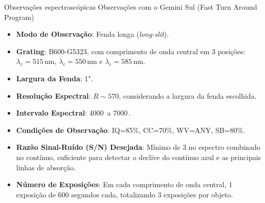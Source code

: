 \begin{frame}[c]{Observações espectroscópicas}
Observações com o Gemini Sul (Fast Turn Around Program)
\footnotesize
\begin{itemize}
    \item \textbf{Modo de Observação}: Fenda longa (\textit{long-slit}).
    \item \textbf{Grating}: B600-G5323, com comprimento de onda central em 3 posições: $\lambda_c = 515 \, \text{nm}$, $\lambda_c = 550 \, \text{nm}$ e $\lambda_c = 585 \, \text{nm}$.
    \item \textbf{Largura da Fenda}: 1".
    \item \textbf{Resolução Espectral}: $R \sim 570$, considerando a largura da fenda escolhida.
    \item \textbf{Intervalo Espectral}: 4000\, a 7000\,.
    \item \textbf{Condições de Observação}: IQ=85\%, CC=70\%, WV=ANY, SB=80\%.
    \item \textbf{Razão Sinal-Ruído (S/N) Desejada}: Mínimo de 3 no espectro combinado no contínuo, suficiente para detectar o declive do contínuo azul e as principais linhas de absorção.
    \item \textbf{Número de Exposições}: Em cada comprimento de onda central, 1 exposição de 600 segundos cada, totalizando 3 exposições por objeto.
\end{itemize}

\end{frame}

